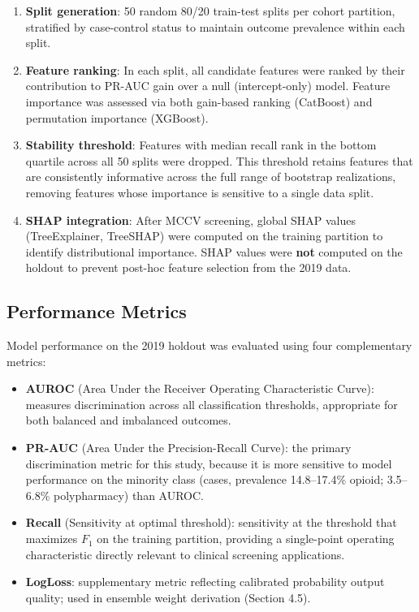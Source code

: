 \documentclass[
  12pt,
]{book}
\providecommand{\tightlist}{%
  \setlength{\itemsep}{0pt}\setlength{\parskip}{0pt}}
\begin{document}
\begin{enumerate}
\def\labelenumi{\arabic{enumi}.}
\tightlist
\item
  \textbf{Split generation}: 50 random 80/20 train-test splits per
  cohort partition, stratified by case-control status to maintain
  outcome prevalence within each split.
\item
  \textbf{Feature ranking}: In each split, all candidate features were
  ranked by their contribution to PR-AUC gain over a null
  (intercept-only) model. Feature importance was assessed via both
  gain-based ranking (CatBoost) and permutation importance (XGBoost).
\item
  \textbf{Stability threshold}: Features with median recall rank in the
  bottom quartile across all 50 splits were dropped. This threshold
  retains features that are consistently informative across the full
  range of bootstrap realizations, removing features whose importance is
  sensitive to a single data split.
\item
  \textbf{SHAP integration}: After MCCV screening, global SHAP values
  (TreeExplainer, TreeSHAP) were computed on the training partition to
  identify distributional importance. SHAP values were \textbf{not}
  computed on the holdout to prevent post-hoc feature selection from the
  2019 data.
\end{enumerate}

\subsection{Performance Metrics}\label{performance-metrics}

Model performance on the 2019 holdout was evaluated using four
complementary metrics:

\begin{itemize}
\tightlist
\item
  \textbf{AUROC} (Area Under the Receiver Operating Characteristic
  Curve): measures discrimination across all classification thresholds,
  appropriate for both balanced and imbalanced outcomes.
\item
  \textbf{PR-AUC} (Area Under the Precision-Recall Curve): the primary
  discrimination metric for this study, because it is more sensitive to
  model performance on the minority class (cases, prevalence
  14.8--17.4\% opioid; 3.5--6.8\% polypharmacy) than AUROC.
\item
  \textbf{Recall} (Sensitivity at optimal threshold): sensitivity at the
  threshold that maximizes \(F_1\) on the training partition, providing
  a single-point operating characteristic directly relevant to clinical
  screening applications.
\item
  \textbf{LogLoss}: supplementary metric reflecting calibrated
  probability output quality; used in ensemble weight derivation
  (Section 4.5).
\end{itemize}
\end{document}
